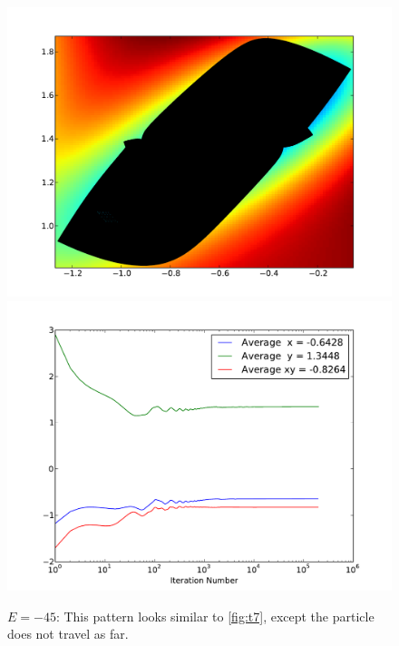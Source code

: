 \documentclass[letterpaper]{article}
\begin{document}
\begin{figure}[p]
\begin{center}
\includegraphics[width=5in]{p5.pdf}
\includegraphics[width=5in]{p5a.pdf}
\end{center}
\caption{$E=-45$: This pattern looks similar to \ref{fig:t7}, except the
particle does not travel as far.}
\label{fig:p5}
\end{figure}
\end{document}
